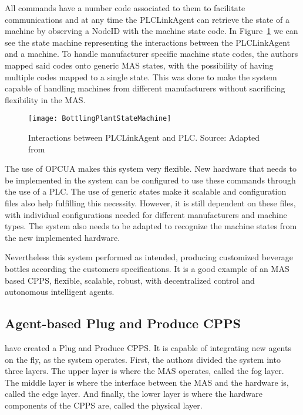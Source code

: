 All commands have a number code associated to them to facilitate communications and at any time the PLCLinkAgent can retrieve the state of a machine by observing a NodeID with the machine state code. In Figure~\ref{fig:bottling_plant_state_achine} we can see the state machine representing the interactions between the PLCLinkAgent and a machine. To handle manufacturer specific machine state codes, the authors mapped said codes onto generic \gls{MAS} states, with the possibility of having multiple codes mapped to a single state. This was done to make the system capable of handling machines from different manufacturers without sacrificing flexibility in the \gls{MAS}.

\begin{figure}[h!]
	\centering
	\texttt{[image: BottlingPlantStateMachine]}
	\caption{Interactions between PLCLinkAgent and \gls{PLC}. Source: Adapted from \cite{bottling_plant_part2}}
	\label{fig:bottling_plant_state_achine}
\end{figure}

The use of \gls{OPCUA} makes this system very flexible. New hardware that needs to be implemented in the system can be configured to use these commands through the use of a \gls{PLC}. The use of generic states make it scalable and configuration files also help fulfilling this necessity. However, it is still dependent on these files, with individual configurations needed for different manufacturers and machine types. The system also needs to be adapted to recognize the machine states from the new implemented hardware.

Nevertheless this system performed as intended, producing customized beverage bottles according the customers specifications. It is a good example of an \gls{MAS} based \gls{CPPS}, flexible, scalable, robust, with decentralized control and autonomous intelligent agents.
 
\subsection{Agent-based Plug and Produce CPPS}
\label{agent_plug_and_produce}

\citeauthor{8972169} \cite{8972169} have created a Plug and Produce \gls{CPPS}. It is capable of integrating new agents on the fly, as the system operates. First, the authors divided the system into three layers. The upper layer is where the \gls{MAS} operates, called the fog layer. The middle layer is where the interface between the \gls{MAS} and the hardware is, called the edge layer. And finally, the lower layer is where the hardware components of the \gls{CPPS} are, called the physical layer.\\

